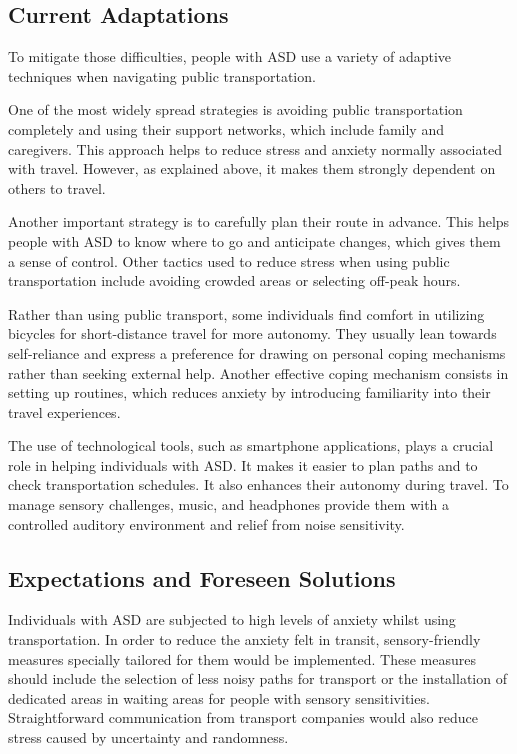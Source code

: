 \subsection{Current Adaptations}

To mitigate those difficulties, people with ASD use a variety of adaptive techniques when navigating public transportation. 

One of the most widely spread strategies is avoiding public transportation completely and using their support networks, which include family and caregivers\cite{2015DetourRightPlace}. This approach helps to reduce stress and anxiety normally associated with travel. However, as explained above, it makes them strongly dependent on others to travel. 

Another important strategy is to carefully plan their route in advance\cite{2020ExperiencesYoungAutistic}. This helps people with ASD to know where to go and anticipate changes, which gives them a sense of control. Other tactics used to reduce stress when using public transportation include avoiding crowded areas or selecting off-peak hours.

Rather than using public transport, some individuals find comfort in utilizing bicycles for short-distance travel\cite{2015ViewpointsAdultsAutism} for more autonomy. They usually lean towards self-reliance and express a preference for drawing on personal coping mechanisms rather than seeking external help. Another effective coping mechanism consists in setting up routines\cite{2015ViewpointsAdultsAutism}, which reduces anxiety by introducing familiarity into their travel experiences. 

The use of technological tools, such as smartphone applications, plays a crucial role in helping individuals with ASD. It makes it easier to plan paths and to check transportation schedules. It also enhances their autonomy during travel. To manage sensory challenges, music, and headphones provide them with a controlled auditory environment and relief from noise sensitivity\cite{2020ExperiencesYoungAutistic}. 

\subsection{Expectations and Foreseen Solutions}

Individuals with ASD are subjected to high levels of anxiety whilst using transportation. In order to reduce the anxiety felt in transit, sensory-friendly measures specially tailored for them would be implemented\cite{2020ExperiencesYoungAutistic}. These measures should include the selection of less noisy paths for transport or the installation of dedicated areas in waiting areas for people with sensory sensitivities. Straightforward communication from transport companies would also reduce stress caused by uncertainty and randomness.


